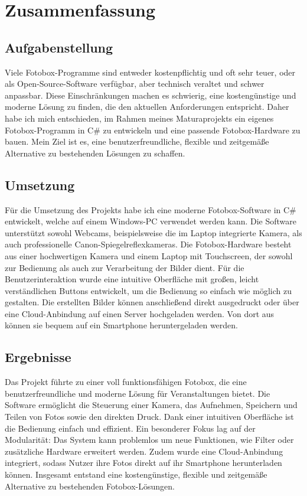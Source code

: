 \documentclass[12pt, a4paper]{article}
\begin{document}
\newpage
\tableofcontents
\newpage

\pagestyle{plain}  %

\section{Zusammenfassung}

\subsection{Aufgabenstellung}

Viele Fotobox-Programme sind entweder kostenpflichtig und oft sehr teuer, oder 
als Open-Source-Software verfügbar, aber technisch veraltet und schwer anpassbar.
Diese Einschränkungen machen es schwierig, eine kostengünstige und moderne
Lösung zu finden, die den aktuellen Anforderungen entspricht.
Daher habe ich mich entschieden, im Rahmen meines Maturaprojekts ein eigenes
Fotobox-Programm in C\# zu entwickeln und eine passende Fotobox-Hardware zu bauen.
Mein Ziel ist es, eine benutzerfreundliche, flexible und zeitgemäße Alternative
zu bestehenden Lösungen zu schaffen.

\subsection{Umsetzung}

Für die Umsetzung des Projekts habe ich eine moderne Fotobox-Software in C\# entwickelt,
welche auf einem Windows-PC verwendet werden kann. Die Software unterstützt sowohl Webcams,
beispielsweise die im Laptop integrierte Kamera, als auch professionelle Canon-Spiegelreflexkameras.
Die Fotobox-Hardware besteht aus einer hochwertigen Kamera und einem Laptop mit Touchscreen,
der sowohl zur Bedienung als auch zur Verarbeitung der Bilder dient. 
Für die Benutzerinteraktion wurde eine intuitive Oberfläche mit großen,
leicht verständlichen Buttons entwickelt, um die Bedienung so einfach wie
möglich zu gestalten. Die erstellten Bilder können anschließend direkt
ausgedruckt oder über eine Cloud-Anbindung auf einen Server hochgeladen werden.
Von dort aus können sie bequem auf ein Smartphone heruntergeladen werden.

\subsection{Ergebnisse}

Das Projekt führte zu einer voll funktionsfähigen Fotobox, die eine
benutzerfreundliche und moderne Lösung für Veranstaltungen bietet.
Die Software ermöglicht die Steuerung einer Kamera, das Aufnehmen,
Speichern und Teilen von Fotos sowie den direkten Druck. Dank einer intuitiven
Oberfläche ist die Bedienung einfach und effizient.
Ein besonderer Fokus lag auf der Modularität: Das System kann problemlos
um neue Funktionen, wie Filter oder zusätzliche Hardware erweitert werden.
Zudem wurde eine Cloud-Anbindung integriert, sodass Nutzer ihre Fotos direkt
auf ihr Smartphone herunterladen können. Insgesamt entstand eine kostengünstige,
flexible und zeitgemäße Alternative zu bestehenden Fotobox-Lösungen.




\end{document}
